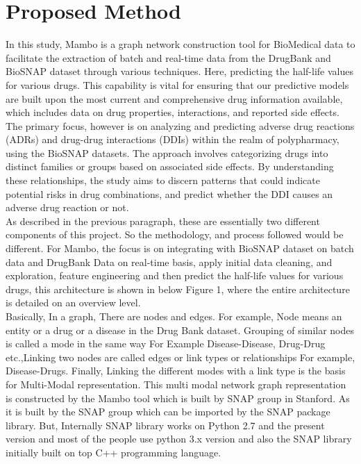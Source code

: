 \documentclass[journal,transmag]{J-NaNA}
\begin{document}
\section{Proposed Method}
In this study, Mambo is a graph network construction tool for BioMedical data to facilitate the extraction of batch and real-time data from the DrugBank and BioSNAP dataset through various techniques. Here, predicting the half-life values for various drugs. This capability is vital for ensuring that our predictive models are built upon the most current and comprehensive drug information available, which includes data on drug properties, interactions, and reported side effects. The primary focus, however is on analyzing and predicting adverse drug reactions (ADRs) and drug-drug interactions (DDIs) within the realm of polypharmacy, using the BioSNAP datasets. The approach involves categorizing drugs into distinct families or groups based on associated side effects. By understanding these relationships, the study aims to discern patterns that could indicate potential risks in drug combinations, and predict whether the DDI causes an adverse drug reaction or not.  
\\
As described in the previous paragraph, these are essentially two different components of this project. So the methodology, and process followed would be different. For Mambo, the focus is on integrating with BioSNAP dataset on batch data and DrugBank Data on real-time basis, apply initial data cleaning, and exploration, feature engineering and then predict the half-life values for various drugs, this architecture is shown in below Figure 1, where the entire architecture is detailed on an overview level.
\\
Basically, In  a graph, There are nodes and edges. For example, Node means an entity or a drug or a disease in the Drug Bank dataset. Grouping of similar nodes is called a mode in the same way For Example Disease-Disease, Drug-Drug etc.,Linking two nodes are called edges or link types or relationships For example, Disease-Drugs. Finally, Linking the different modes with a link type is the basis for Multi-Modal representation. This multi modal network graph representation is constructed by the Mambo tool which is built by SNAP group in Stanford. As it is built by the SNAP group which can be imported by the SNAP package library. But, Internally SNAP library works on Python 2.7 and the present version and most of the people use python 3.x version and also the SNAP library initially built on top C++ programming language.
\\
\end{document}
